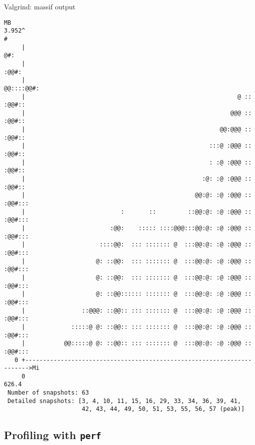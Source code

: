 \documentclass[10pt,xcolor=table]{beamer}
\begin{document}
\begin{frame}[fragile]{Valgrind: massif output}

  \vspace*{-.7cm}%
  \begin{lstlisting}[style=valgrind,xleftmargin=-0.75cm,basicstyle=\scriptsize\ttfamily,] 
   MB
3.952^                                                                    #
     |                                                                   @#:
     |                                                                 :@@#:
     |                                                            @@::::@@#:
     |                                                            @ :: :@@#::
     |                                                          @@@ :: :@@#::
     |                                                       @@:@@@ :: :@@#::
     |                                                    :::@ :@@@ :: :@@#::
     |                                                    : :@ :@@@ :: :@@#::
     |                                                  :@: :@ :@@@ :: :@@#::
     |                                                @@:@: :@ :@@@ :: :@@#:::
     |                           :       ::         ::@@:@: :@ :@@@ :: :@@#:::
     |                        :@@:    ::::: ::::@@@:::@@:@: :@ :@@@ :: :@@#:::
     |                     ::::@@:  ::: ::::::: @  :::@@:@: :@ :@@@ :: :@@#:::
     |                    @: ::@@:  ::: ::::::: @  :::@@:@: :@ :@@@ :: :@@#:::
     |                    @: ::@@:  ::: ::::::: @  :::@@:@: :@ :@@@ :: :@@#:::
     |                    @: ::@@:::::: ::::::: @  :::@@:@: :@ :@@@ :: :@@#:::
     |                ::@@@: ::@@:: ::: ::::::: @  :::@@:@: :@ :@@@ :: :@@#:::
     |             :::::@ @: ::@@:: ::: ::::::: @  :::@@:@: :@ :@@@ :: :@@#:::
     |           @@:::::@ @: ::@@:: ::: ::::::: @  :::@@:@: :@ :@@@ :: :@@#:::
   0 +----------------------------------------------------------------------->Mi
     0                                                                   626.4
 Number of snapshots: 63
 Detailed snapshots: [3, 4, 10, 11, 15, 16, 29, 33, 34, 36, 39, 41,
                      42, 43, 44, 49, 50, 51, 53, 55, 56, 57 (peak)]
  \end{lstlisting}
\end{frame}


\subsection{Profiling with {\tt perf}}
\end{document}
